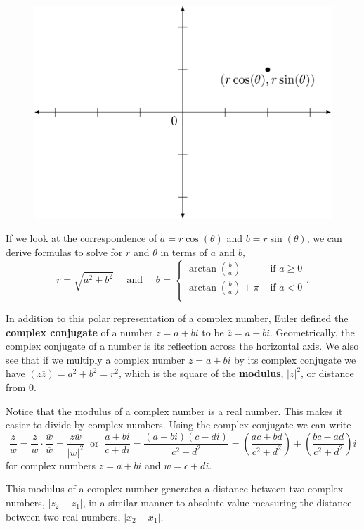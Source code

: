 \documentclass[
]{book}
\theoremstyle{definition}
\theoremstyle{definition}
\theoremstyle{definition}
\theoremstyle{definition}
\theoremstyle{remark}
\begin{document}
\begin{figure}

{\centering \includegraphics[width=0.6\linewidth]{tikz/complex-polar} 

}

\end{figure}

If we look at the correspondence of \(a=r\cos(\theta)\) and \(b=r\sin(\theta)\), we can derive formulas to solve for \(r\) and \(\theta\) in terms of \(a\) and \(b\),
\[r= \sqrt{a^2+b^2} \quad \mbox{ and } \quad \theta = \begin{cases} \arctan\left(\frac{b}{a}\right) & \mbox{ if } a\geq 0 \\
\arctan\left(\frac{b}{a}\right)+\pi & \mbox{ if } a<0\\
\end{cases}.\]

In addition to this polar representation of a complex number, Euler defined the \textbf{complex conjugate} of a number \(z=a+bi\) to be \(\overline{z}=a-bi\). Geometrically, the complex conjugate of a number is its reflection across the horizontal axis. We also see that if we multiply a complex number \(z=a+bi\) by its complex conjugate we have \((z\overline{z}) = a^2+b^2=r^2\), which is the square of the \textbf{modulus}, \(|z|^2\), or distance from \(0\).

Notice that the modulus of a complex number is a real number. This makes it easier to divide by complex numbers. Using the complex conjugate we can write
\[\frac{z}{w} = \frac{z}{w} \cdot \frac{\overline{w}}{\overline{w}} = \frac{z\overline{w}}{|w|^2} \:  \mbox{ or } \: \frac{a+bi}{c+di} = \frac{(a+bi)(c-di)}{c^2+d^2} = \left(\frac{ac+bd}{c^2+d^2}\right) + \left(\frac{bc-ad}{c^2+d^2}\right) i\] for complex numbers \(z=a+bi\) and \(w=c+di\).

This modulus of a complex number generates a distance between two complex numbers, \(|z_2-z_1|\), in a similar manner to absolute value measuring the distance between two real numbers, \(|x_2-x_1|\).
\end{document}

